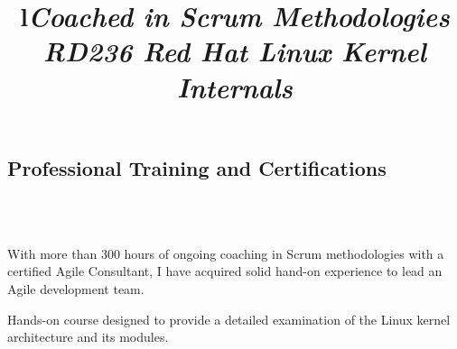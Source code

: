 \documentclass[overlapped,line,letterpaper]{res}
\begin{document}
\begin{resume}



  \section{\bf Professional Training and Certifications}

  \begin{format}
    \title{l}\\
    \body\\
  \end{format}

  \title{\em{Coached in Scrum Methodologies} }
  \begin{position}
    With more than 300 hours of ongoing coaching in Scrum methodologies with a
    certified Agile Consultant, I have acquired solid hand-on experience to lead
    an Agile development team.
  \end{position}




  \title{\em{RD236 Red Hat Linux Kernel Internals} }
  \begin{position}
    Hands-on course designed to provide a detailed examination of the
    Linux kernel architecture and its modules.
  \end{position}


\end{resume}
\end{document}
